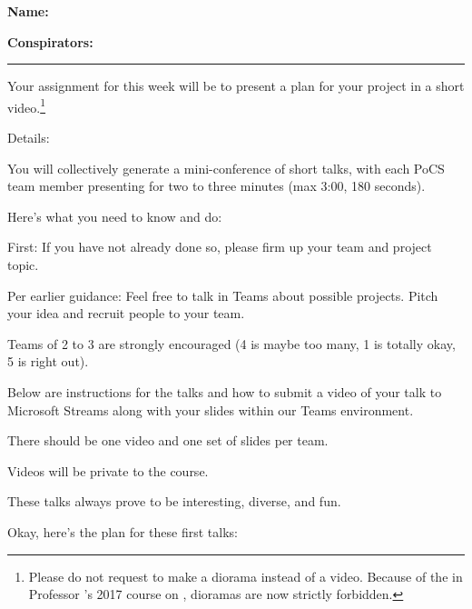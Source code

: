 \textbf{Name:} \\

\medskip

\textbf{Conspirators:} 

\medskip
\medskip

\hrule

\medskip


\assignmentsonly{\pleasesubmitprojectdraft}

Your assignment for this week will be to present
a plan for your project in a short video.\footnote{Please do not request to make a diorama instead of a video.
Because of the  in Professor 's 2017 course on  , dioramas are now strictly forbidden.}

Details:

You will collectively generate a mini-conference of short talks,
with each PoCS team member presenting for two to three minutes
(max 3:00, 180 seconds).

Here's what you need to know and do:

First: If you have not already done so,
please firm up your team and project topic.

Per earlier guidance:
Feel free to talk in Teams about possible projects.
Pitch your idea and recruit people to your team.

Teams of 2 to 3 are strongly encouraged (4 is maybe too many, 1 is totally okay, 5 is right out).

Below are instructions for the talks and how to submit a video of your talk to Microsoft Streams
along with your slides within our Teams environment.

There should be one video and one set of slides per team.

Videos will be private to the course.

These talks always prove to be interesting, diverse, and fun.

Okay, here's the plan for these first talks:

